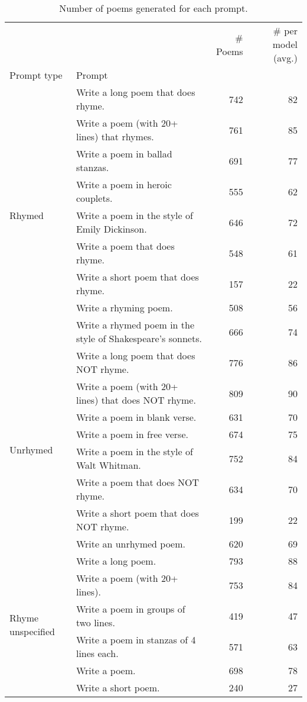 \documentclass{simple-humanities}         %
\begin{document}
\begin{table}[H]
  \centering
  \small
  \singlespacing
  \begin{tabular}{llrr}
    \toprule
     &  & \# Poems & \# per model (avg.) \\
    Prompt type & Prompt &  &  \\
    \midrule
    \multirow[t]{9}{*}{Rhymed} & Write a long poem that does rhyme. & 742 & 82 \\
     & Write a poem (with 20+ lines) that rhymes. & 761 & 85 \\
     & Write a poem in ballad stanzas. & 691 & 77 \\
     & Write a poem in heroic couplets. & 555 & 62 \\
     & Write a poem in the style of Emily Dickinson. & 646 & 72 \\
     & Write a poem that does rhyme. & 548 & 61 \\
     & Write a short poem that does rhyme. & 157 & 22 \\
     & Write a rhyming poem. & 508 & 56 \\
     & Write a rhymed poem in the style of Shakespeare's sonnets. & 666 & 74 \\
    \cline{1-4}
    \multirow[t]{8}{*}{Unrhymed} & Write a long poem that does NOT rhyme. & 776 & 86 \\
     & Write a poem (with 20+ lines) that does NOT rhyme. & 809 & 90 \\
     & Write a poem in blank verse. & 631 & 70 \\
     & Write a poem in free verse. & 674 & 75 \\
     & Write a poem in the style of Walt Whitman. & 752 & 84 \\
     & Write a poem that does NOT rhyme. & 634 & 70 \\
     & Write a short poem that does NOT rhyme. & 199 & 22 \\
     & Write an unrhymed poem. & 620 & 69 \\
    \cline{1-4}
    \multirow[t]{6}{*}{Rhyme unspecified} & Write a long poem. & 793 & 88 \\
     & Write a poem (with 20+ lines). & 753 & 84 \\
     & Write a poem in groups of two lines. & 419 & 47 \\
     & Write a poem in stanzas of 4 lines each. & 571 & 63 \\
     & Write a poem. & 698 & 78 \\
     & Write a short poem. & 240 & 27 \\
    \cline{1-4}
    \bottomrule
    \end{tabular}    
  \caption{Number of poems generated for each prompt.}
  \label{tab:num_poems_prompts}
  \end{table}
\end{document}
